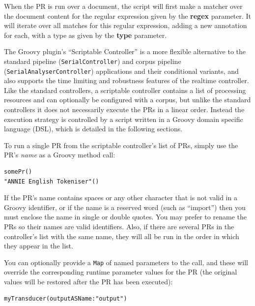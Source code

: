 When the PR is run over a document, the script will first make a matcher over
the document content for the regular expression given by the \textbf{regex}
parameter. It will iterate over all matches for this regular expression,
adding a new annotation for each, with a type as given by the \textbf{type}
parameter.


The Groovy plugin's ``Scriptable Controller'' is a more flexible alternative to
the standard pipeline ({\tt SerialController}) and corpus pipeline
({\tt SerialAnalyserController}) applications and their conditional variants,
and also supports the time limiting and robustness features of the realtime
controller.  Like the standard controllers, a scriptable controller contains a
list of processing resources and can optionally be configured with a corpus,
but unlike the standard controllers it does not necessarily execute the PRs in
a linear order.  Instead the execution strategy is controlled by a script
written in a Groovy domain specific language (DSL), which is detailed in the
following sections.


To run a single PR from the scriptable controller's list of PRs, simply use the
PR's \emph{name} as a Groovy method call:
\begin{lstlisting}
somePr()
"ANNIE English Tokeniser"()
\end{lstlisting}
%
If the PR's name contains spaces or any other character that is not valid in a
Groovy identifier, or if the name is a reserved word (such as ``import'') then
you must enclose the name in single or double quotes.  You may prefer to rename
the PRs so their names are valid identifiers.  Also, if there are several PRs
in the controller's list with the same name, they will all be run in the order
in which they appear in the list.

You can optionally provide a {\tt Map} of named parameters to the call, and
these will override the corresponding runtime parameter values for the PR (the
original values will be restored after the PR has been executed):
\begin{lstlisting}
myTransducer(outputASName:"output")
\end{lstlisting}


